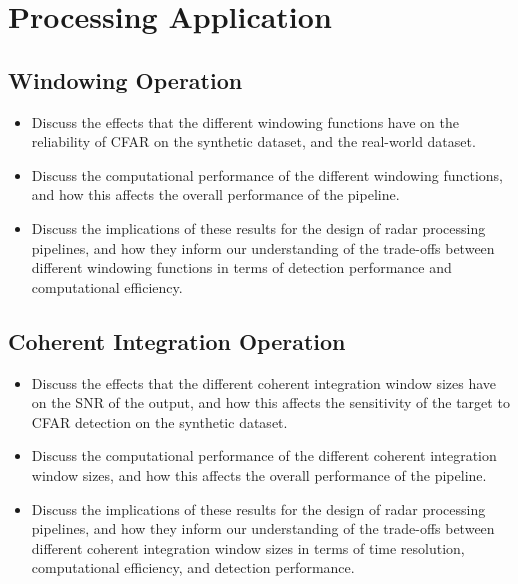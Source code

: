 \section{Processing Application}

\subsection{Windowing Operation}
\begin{itemize}
    \item Discuss the effects that the different windowing functions have on the reliability of CFAR on the synthetic dataset, and the real-world dataset.
    \item Discuss the computational performance of the different windowing functions, and how this affects the overall performance of the pipeline.
    \item Discuss the implications of these results for the design of radar processing pipelines, and how they inform our understanding of the trade-offs between different windowing functions in terms of detection performance and computational efficiency.
\end{itemize}

\subsection{Coherent Integration Operation}
\begin{itemize}
    \item Discuss the effects that the different coherent integration window sizes have on the SNR of the output, and how this affects the sensitivity of the target to CFAR detection on the synthetic dataset. 
    \item Discuss the computational performance of the different coherent integration window sizes, and how this affects the overall performance of the pipeline.
    \item Discuss the implications of these results for the design of radar processing pipelines, and how they inform our understanding of the trade-offs between different coherent integration window sizes in terms of time resolution, computational efficiency, and detection performance.
\end{itemize}
